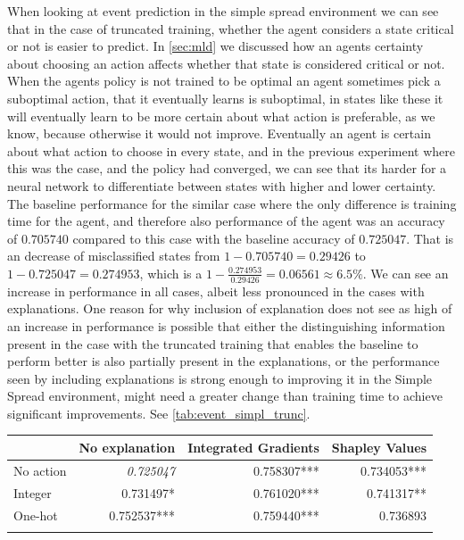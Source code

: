 \documentclass[UKenglish]{uiomasterthesis}
\begin{document}
When looking at event prediction in the simple spread environment we can see that in the case of truncated training, whether the agent considers a state critical or not is easier to predict. In \cref{sec:mld} we discussed how an agents certainty about choosing an action affects whether that state is considered critical or not. When the agents policy is not trained to be optimal an agent sometimes pick a suboptimal action, that it eventually learns is suboptimal, in states like these it will eventually learn to be more certain about what action is preferable, as we know, because otherwise it would not improve. Eventually an agent is certain about what action to choose in every state, and in the previous experiment where this was the case, and the policy had converged, we can see that its harder for a neural network to differentiate between states with higher and lower certainty. The baseline performance for the similar case where the only difference is training time for the agent, and therefore also performance of the agent was an accuracy of $0.705740$ compared to this case with the baseline accuracy of $0.725047$. That is an decrease of misclassified states from $1-0.705740 = 0.29426$ to $1-0.725047 = 0.274953$, which is a $1-\frac{0.274953}{0.29426}=0.06561\approx 6.5\%$. We can see an increase in performance in all cases, albeit less pronounced in the cases with explanations. One reason for why inclusion of explanation does not see as high of an increase in performance is possible that either the distinguishing information present in the case with the truncated training that enables the baseline to perform better is also partially present in the explanations, or the performance seen by including explanations is strong enough to improving it in the Simple Spread environment, might need a greater change than training time to achieve significant improvements. See \cref{tab:event_simpl_trunc}.

\begin{center}
\label{tab:event_simpl_trunc}
\begin{tabular}{lrrr}
\toprule
 & No explanation & Integrated Gradients & Shapley Values \\
 \midrule
No action & \textit{0.725047} & 0.758307*** & 0.734053*** \\
Integer & 0.731497* & 0.761020*** & 0.741317** \\
One-hot & 0.752537*** & 0.759440*** & 0.736893 \\
\bottomrule
\addlinespace[2pt]
\multicolumn{3}{l}{\textsuperscript{***}$p<0.001$, 
  \textsuperscript{**}$p<0.01$, 
  \textsuperscript{*}$p<0.05$}
\end{tabular}
\end{center}
\end{document}
